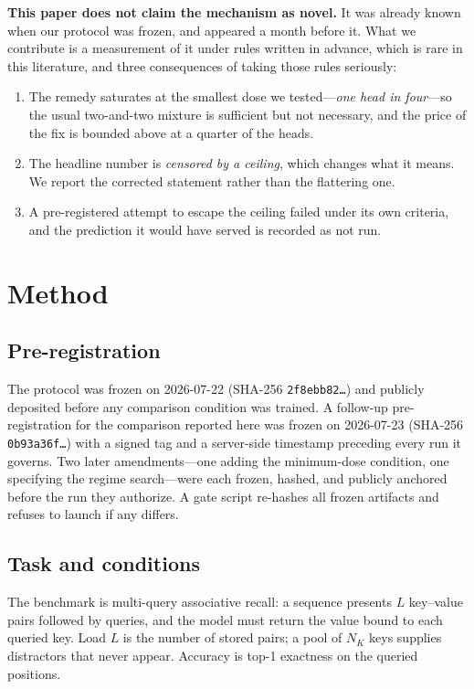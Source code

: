 \documentclass{article}
\begin{document}
\textbf{This paper does not claim the mechanism as novel.} It was already known when our
protocol was frozen, and \citet{tan2026hydrahead} appeared a month before it. What we
contribute is a measurement of it under rules written in advance, which is rare in this
literature, and three consequences of taking those rules seriously:

\begin{enumerate}
  \item The remedy saturates at the smallest dose we tested---\emph{one head in four}---so the
        usual two-and-two mixture is sufficient but not necessary, and the price of the fix is
        bounded above at a quarter of the heads.
  \item The headline number is \emph{censored by a ceiling}, which changes what it means. We
        report the corrected statement rather than the flattering one.
  \item A pre-registered attempt to escape the ceiling failed under its own criteria, and the
        prediction it would have served is recorded as not run.
\end{enumerate}

\section{Method}

\subsection{Pre-registration}
\label{sec:prereg-hashes}

The protocol was frozen on 2026-07-22 (SHA-256 \texttt{2f8ebb82\dots}) and publicly deposited
before any comparison condition was trained. A follow-up pre-registration for the comparison
reported here was frozen on 2026-07-23 (SHA-256 \texttt{0b93a36f\dots}) with a signed tag and a
server-side timestamp preceding every run it governs. Two later amendments---one adding the
minimum-dose condition, one specifying the regime search---were each frozen, hashed, and
publicly anchored before the run they authorize. A gate script re-hashes all frozen artifacts
and refuses to launch if any differs.

\subsection{Task and conditions}

The benchmark is multi-query associative recall: a sequence presents $L$ key--value pairs
followed by queries, and the model must return the value bound to each queried key. Load $L$
is the number of stored pairs; a pool of $N_K$ keys supplies distractors that never appear.
Accuracy is top-1 exactness on the queried positions.
\end{document}
